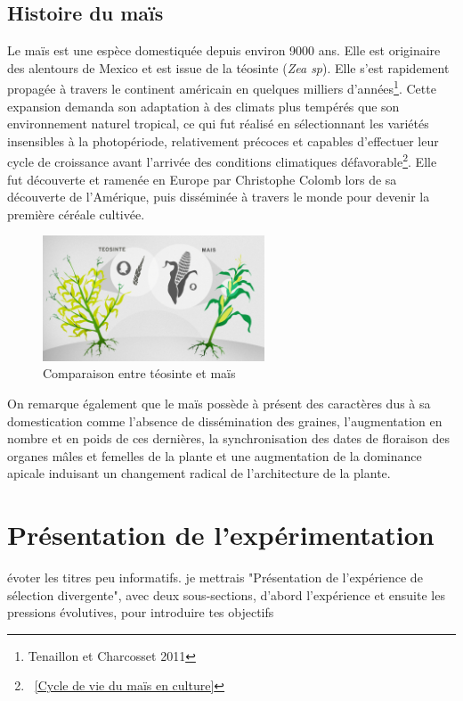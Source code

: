 \documentclass[12pt,a4paper]{report}
\newcommand{\com}[1]{{\noindent  \color{red}#1}}
\begin{document}
			\subsection{Histoire du maïs}
				Le maïs est une espèce domestiquée depuis environ 9000 ans. Elle est originaire des alentours de Mexico et est issue de la téosinte (\textit{Zea sp}). Elle s'est rapidement propagée à travers le continent américain\cite{tenaillon} en quelques milliers d'années\footnote{Tenaillon et Charcosset 2011}. Cette expansion demanda son adaptation à des climats plus tempérés que son environnement naturel tropical, ce qui fut réalisé en sélectionnant les variétés insensibles à la photopériode, relativement précoces et capables d'effectuer leur cycle de croissance avant l'arrivée des conditions climatiques défavorable\footnote{~\ref{Cycle de vie du maïs en culture}}. Elle fut découverte et ramenée en Europe par Christophe Colomb lors de sa découverte de l'Amérique, puis disséminée à travers le monde pour devenir la première céréale cultivée.
				\begin{figure}
					\includegraphics[width=6.6cm]{comparaison.jpg}
					\caption{Comparaison entre téosinte et maïs}
					\label{Comparaison entre téosinte et maïs}
				\end{figure}
				On remarque également que le maïs possède à présent des caractères dus à sa domestication comme l'absence de dissémination des graines, l'augmentation en nombre et en poids de ces dernières, la synchronisation des dates de floraison des organes mâles et femelles de la plante et une augmentation de la dominance apicale induisant un changement radical de l'architecture de la plante.
				
		\section{Présentation de l'expérimentation}

\com{évoter les titres peu informatifs. je mettrais "Présentation de l'expérience de sélection divergente", avec deux sous-sections, d'abord l'expérience et ensuite les pressions évolutives, pour introduire tes objectifs}
		
\end{document}
